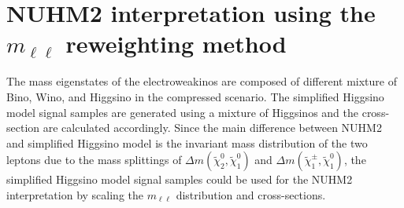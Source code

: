 

\section{NUHM2 interpretation using the $m_{\ell \ell}$ reweighting method}
\label{sec:results_mll_reweighting}
The mass eigenstates of the electroweakinos are composed of different mixture of Bino, Wino, and Higgsino in the compressed scenario.
The simplified Higgsino model signal samples are generated using a mixture of Higgsinos and the cross-section are calculated accordingly.
Since the main difference between NUHM2 and simplified Higgsino model is the invariant mass distribution of the two leptons due to the mass splittings of $\Delta m(\widetilde{\chi}^{0}_{2}, \widetilde{\chi}^{0}_{1})$ and $\Delta m(\widetilde{\chi}^{\pm}_{1}, \widetilde{\chi}^{0}_{1})$, the simplified Higgsino model signal samples could be used for the NUHM2 interpretation by scaling the $m_{\ell \ell}$ distribution and cross-sections.

